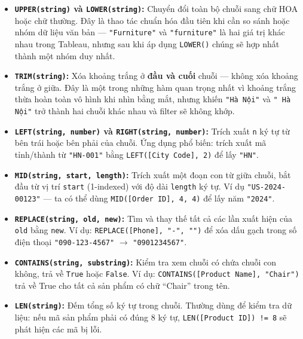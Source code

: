 \documentclass[12pt]{article}
\begin{document}
\begin{itemize}
    \item \textbf{\texttt{UPPER(string)} và \texttt{LOWER(string)}:} Chuyển đổi toàn bộ chuỗi sang chữ HOA hoặc chữ thường. Đây là thao tác chuẩn hóa đầu tiên khi cần so sánh hoặc nhóm dữ liệu văn bản --- \texttt{"Furniture"} và \texttt{"furniture"} là hai giá trị khác nhau trong Tableau, nhưng sau khi áp dụng \texttt{LOWER()} chúng sẽ hợp nhất thành một nhóm duy nhất.

    \item \textbf{\texttt{TRIM(string)}:} Xóa khoảng trắng ở \textbf{đầu và cuối} chuỗi --- không xóa khoảng trắng ở giữa. Đây là một trong những hàm quan trọng nhất vì khoảng trắng thừa hoàn toàn vô hình khi nhìn bằng mắt, nhưng khiến \texttt{"Hà Nội"} và \texttt{" Hà Nội"} trở thành hai chuỗi khác nhau và filter sẽ không khớp.

    \item \textbf{\texttt{LEFT(string, number)} và \texttt{RIGHT(string, number)}:} Trích xuất \texttt{n} ký tự từ bên trái hoặc bên phải của chuỗi. Ứng dụng phổ biến: trích xuất mã tỉnh/thành từ \texttt{"HN-001"} bằng \texttt{LEFT([City Code], 2)} để lấy \texttt{"HN"}.

    \item \textbf{\texttt{MID(string, start, length)}:} Trích xuất một đoạn con từ giữa chuỗi, bắt đầu từ vị trí \texttt{start} (1-indexed) với độ dài \texttt{length} ký tự. Ví dụ \texttt{"US-2024-00123"} --- ta có thể dùng \texttt{MID([Order ID], 4, 4)} để lấy năm \texttt{"2024"}.

    \item \textbf{\texttt{REPLACE(string, old, new)}:} Tìm và thay thế tất cả các lần xuất hiện của \texttt{old} bằng \texttt{new}. Ví dụ: \texttt{REPLACE([Phone], "-", "")} để xóa dấu gạch trong số điện thoại \texttt{"090-123-4567"} $\rightarrow$ \texttt{"0901234567"}.

    \item \textbf{\texttt{CONTAINS(string, substring)}:} Kiểm tra xem chuỗi có chứa chuỗi con không, trả về \texttt{True} hoặc \texttt{False}. Ví dụ: \texttt{CONTAINS([Product Name], "Chair")} trả về True cho tất cả sản phẩm có chữ ``Chair'' trong tên.

    \item \textbf{\texttt{LEN(string)}:} Đếm tổng số ký tự trong chuỗi. Thường dùng để kiểm tra dữ liệu: nếu mã sản phẩm phải có đúng 8 ký tự, \texttt{LEN([Product ID]) != 8} sẽ phát hiện các mã bị lỗi.


\end{itemize}
\end{document}
